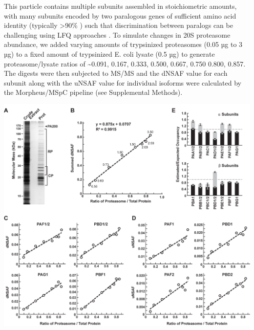 This particle contains multiple subunits assembled in stoichiometric amounts, with many subunits encoded by two paralogous genes of sufficient amino acid identity (typically >90\% \citep{yang04}) such that discrimination between paralogs can be challenging using LFQ approaches \citep{book10}.
To simulate changes in 20S proteasome abundance, we added varying amounts of trypsinized proteasomes (0.05 µg to 3 µg) to a fixed amount of trypsinized E. coli lysate (0.5 µg) to generate proteasome/lysate ratios of \textasciitilde0.091, 0.167, 0.333, 0.500, 0.667, 0.750 0.800, 0.857.
The digests were then subjected to MS/MS and the dNSAF value for each subunit along with the uNSAF value for individual isoforms were calculated by the Morpheus/MSpC pipeline (see Supplemental Methods).
\begin{FPfigure}
	\centering
	\includegraphics[width=\columnwidth]{MSpC/figure2_rescale.png}

\end{FPfigure}
